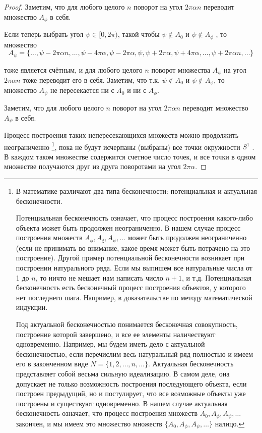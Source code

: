 \begin{proof}
Заметим, что для любого целого $n$ поворот на
угол $2\pi\alpha n$ переводит множество $A_\phi$ в себя.

Если теперь выбрать угол $\psi \in [0, 2\pi)$, такой чтобы $\psi \notin A_0$ и $\psi \notin A_\phi$ , то множество
\begin{equation*}
	A_\psi = \{\ldots , \psi - 2\pi\alpha n, \ldots , \psi - 4\pi\alpha, \psi - 2\pi\alpha, \psi, \psi + 2\pi\alpha, \psi + 4\pi\alpha, \ldots , \psi + 2\pi\alpha n, \ldots \}
\end{equation*}

тоже является счётным, и для любого целого $n$ поворот множества $A_\psi$ на угол $2\pi\alpha n$ тоже переводит его в себя. Заметим, что т.к. $\psi \notin A_0$ и $\psi \notin A_\phi$, то
множество $A_\psi$ не пересекается ни с $A_0$ и ни с $A_\phi$. 

Заметим, что для любого целого $n$ поворот на угол $2\pi\alpha n$ переводит множество $A_\psi$ в себя.

Процесс построения таких непересекающихся множеств можно продолжить неограниченно
\footnote{
	В математике различают два типа бесконечности: потенциальная и актуальная бесконечности.

	Потенциальная бесконечность означает, что процесс построения какого-либо объекта может быть продолжен неограниченно. В нашем случае процесс построения множеств $A_\phi , A_\xi , A_\psi , \ldots$ может быть продолжен неограниченно (если не принимать во внимание, какое время может быть потрачено на это построение).
	Другой пример потенциальной бесконечности возникает при построении натурального ряда.
	Если мы выпишем все натуральные числа от 1 до $n$, то ничто не мешает нам написать число $n+1$, и т.д.
	Потенциальная бесконечность есть бесконечный процесс построения объектов, у которого нет последнего шага. Например, в доказательстве по методу математической индукции.

	Под актуальной бесконечностью понимается бесконечная совокупность, построение которой завершено, и все ее элементы наличествуют одновременно. Например, мы будем иметь дело с актуальной бесконечностью, если перечислим весь натуральный ряд полностью и имеем его в законченном виде
	$N = \{1, 2, \ldots , n, \ldots \}$. Актуальная бесконечность представляет собой весьма сильную идеализацию. В
	самом деле, она допускает не только возможность построения последующего объекта, если построен
	предыдущий, но и постулирует, что все возможные объекты уже построены и существуют одновременно.
	В нашем случае актуальная бесконечность означает, что процесс построения множеств $A_0, A_\phi, A_\psi , \ldots$
	закончен, и мы имеем это множество множеств $\{A_0, A_\phi, A_\psi , \ldots\}$ налицо.
}, пока не будут исчерпаны (выбраны) все точки окружности $S^1$ . В каждом таком множестве содержится счетное число точек, и все точки в одном множестве получаются друг из друга поворотами на угол $2\pi\alpha$.


\end{proof}
